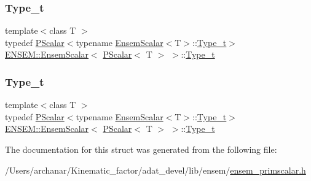 \subsubsection{\texorpdfstring{Type\_t}{Type\_t}\hspace{0.1cm}{\footnotesize\ttfamily [1/2]}}
{\footnotesize\ttfamily template$<$class T $>$ \\
typedef \mbox{\hyperlink{classENSEM_1_1PScalar}{P\+Scalar}}$<$typename \mbox{\hyperlink{structENSEM_1_1EnsemScalar}{Ensem\+Scalar}}$<$T$>$\+::\mbox{\hyperlink{structENSEM_1_1EnsemScalar_3_01PScalar_3_01T_01_4_01_4_a6f38dbaec74e64f56351f84b5d2c8c0c}{Type\+\_\+t}}$>$ \mbox{\hyperlink{structENSEM_1_1EnsemScalar}{E\+N\+S\+E\+M\+::\+Ensem\+Scalar}}$<$ \mbox{\hyperlink{classENSEM_1_1PScalar}{P\+Scalar}}$<$ T $>$ $>$\+::\mbox{\hyperlink{structENSEM_1_1EnsemScalar_3_01PScalar_3_01T_01_4_01_4_a6f38dbaec74e64f56351f84b5d2c8c0c}{Type\+\_\+t}}}

\mbox{\label{structENSEM_1_1EnsemScalar_3_01PScalar_3_01T_01_4_01_4_a6f38dbaec74e64f56351f84b5d2c8c0c}} 
\subsubsection{\texorpdfstring{Type\_t}{Type\_t}\hspace{0.1cm}{\footnotesize\ttfamily [2/2]}}
{\footnotesize\ttfamily template$<$class T $>$ \\
typedef \mbox{\hyperlink{classENSEM_1_1PScalar}{P\+Scalar}}$<$typename \mbox{\hyperlink{structENSEM_1_1EnsemScalar}{Ensem\+Scalar}}$<$T$>$\+::\mbox{\hyperlink{structENSEM_1_1EnsemScalar_3_01PScalar_3_01T_01_4_01_4_a6f38dbaec74e64f56351f84b5d2c8c0c}{Type\+\_\+t}}$>$ \mbox{\hyperlink{structENSEM_1_1EnsemScalar}{E\+N\+S\+E\+M\+::\+Ensem\+Scalar}}$<$ \mbox{\hyperlink{classENSEM_1_1PScalar}{P\+Scalar}}$<$ T $>$ $>$\+::\mbox{\hyperlink{structENSEM_1_1EnsemScalar_3_01PScalar_3_01T_01_4_01_4_a6f38dbaec74e64f56351f84b5d2c8c0c}{Type\+\_\+t}}}



The documentation for this struct was generated from the following file\+:\begin{DoxyCompactItemize}
\item 
/\+Users/archanar/\+Kinematic\+\_\+factor/adat\+\_\+devel/lib/ensem/\mbox{\hyperlink{lib_2ensem_2ensem__primscalar_8h}{ensem\+\_\+primscalar.\+h}}\end{DoxyCompactItemize}
